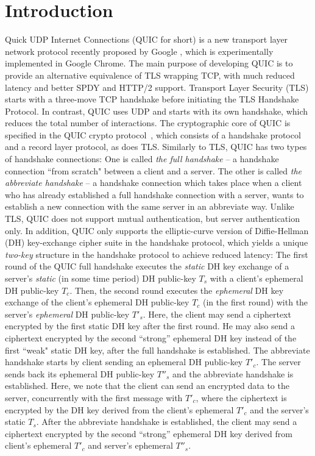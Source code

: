 \section{Introduction} \label{sec:intro}
Quick UDP Internet Connections (QUIC for short) is a
new transport layer network protocol recently proposed by Google \cite{QUIC,QUICDraft},
which is experimentally implemented in Google Chrome.
The main purpose of developing QUIC is to provide an alternative equivalence of TLS wrapping TCP,
with much reduced latency and better SPDY and HTTP/2 support.
Transport Layer Security (TLS) starts with a three-move TCP handshake
before initiating the TLS Handshake Protocol.
In contrast, QUIC uses UDP and starts with its own handshake,
which reduces the total number of interactions.
The cryptographic core of QUIC is specified in the QUIC crypto protocol~\cite{QUIC:Crypto},
which consists of a handshake protocol and a record layer protocol, as does TLS.
Similarly to TLS, QUIC has two types of handshake connections:
One is called \textit{the full handshake} -- a handshake connection
``from scratch" between a client and a server.
The other is called \textit{the abbreviate handshake} -- a handshake connection
which takes place when a client who has already established a full handshake connection with a server,
wants to establish a new connection with the same server in an abbreviate way.
Unlike TLS, QUIC does not support mutual authentication, but server authentication only.
In addition, QUIC only supports the elliptic-curve version of Diffie-Hellman (DH) key-exchange cipher suite
in the handshake protocol,  which yields a unique \textit{two-key} structure in the handshake protocol
to achieve reduced latency:
The first round of the QUIC full handshake executes the \textit{static} DH key exchange of
a server's \textit{static} (in some time period) DH public-key $T_s$
with a client's ephemeral DH public-key $T_c$.
Then, the second round executes the \textit{ephemeral} DH key exchange of
the client's ephemeral DH public-key $T_c$ (in the first round) with
the server's \textit{ephemeral} DH public-key $T'_s$.
Here, the client may send a ciphertext encrypted by the first static DH key after the first round.
He may also send a ciphertext encrypted by the second ``strong'' ephemeral DH key
instead of the first ``weak" static DH key, after the full handshake is established.
The abbreviate handshake starts by client sending an ephemeral DH public-key $T'_c$.
The server sends back its ephemeral DH public-key $T''_s$ and the abbreviate handshake is established.
Here, we note that the client can send an encrypted data to the server,
concurrently with the first message with $T'_c$, where
the ciphertext is encrypted by the DH key derived from
the client's ephemeral $T'_c$ and the server's static $T_s$.
After the abbreviate handshake is established,
the client may send a ciphertext encrypted by the second ``strong'' ephemeral DH key
derived from client's ephemeral $T'_c$ and server's ephemeral $T''_s$.

